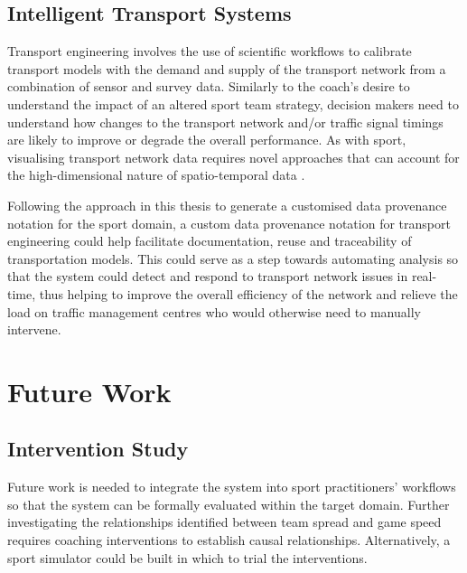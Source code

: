 
\subsection{Intelligent Transport Systems}

Transport engineering involves the use of scientific workflows to calibrate transport models with the demand and supply of the transport network from a combination of sensor and survey data. Similarly to the coach's desire to understand the impact of an altered sport team strategy, decision makers need to understand how changes to the transport network and/or traffic signal timings are likely to improve or degrade the overall performance. As with sport, visualising transport network data requires novel approaches that can account for the high-dimensional nature of spatio-temporal data \cite{Simmons2015}.

Following the approach in this thesis to generate a customised data provenance notation for the sport domain, a custom data provenance notation for transport engineering could help facilitate documentation, reuse and traceability of transportation models. This could serve as a step towards automating analysis so that the system could detect and respond to transport network issues in real-time, thus helping to improve the overall efficiency of the network and relieve the load on traffic management centres who would otherwise need to manually intervene.


\section{Future Work}
\label{sec:conclusion-future-work}

\subsection{Intervention Study}

Future work is needed to integrate the system into sport practitioners' workflows so that the system can be formally evaluated within the target domain. Further investigating the relationships identified between team spread and game speed requires coaching interventions to establish causal relationships. Alternatively, a sport simulator could be built in which to trial the interventions.

